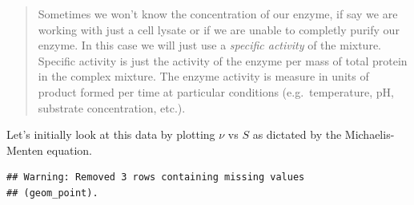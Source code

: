 \documentclass[
]{article}
\newenvironment{Shaded}{\begin{snugshade}}{\end{snugshade}}
\newcommand{\AttributeTok}[1]{\textcolor[rgb]{0.77,0.63,0.00}{#1}}
\newcommand{\DecValTok}[1]{\textcolor[rgb]{0.00,0.00,0.81}{#1}}
\newcommand{\FloatTok}[1]{\textcolor[rgb]{0.00,0.00,0.81}{#1}}
\newcommand{\FunctionTok}[1]{\textcolor[rgb]{0.00,0.00,0.00}{#1}}
\newcommand{\NormalTok}[1]{#1}
\newcommand{\OtherTok}[1]{\textcolor[rgb]{0.56,0.35,0.01}{#1}}
\newcommand{\SpecialCharTok}[1]{\textcolor[rgb]{0.00,0.00,0.00}{#1}}
\newcommand{\StringTok}[1]{\textcolor[rgb]{0.31,0.60,0.02}{#1}}
\begin{document}
\begin{quote}
Sometimes we won't know the concentration of our enzyme, if say we are working with just a cell lysate or if we are unable to completly purify our enzyme. In this case we will just use a \emph{specific activity} of the mixture. Specific activity is just the activity of the enzyme per mass of total protein in the complex mixture. The enzyme activity is measure in units of product formed per time at particular conditions (e.g.~temperature, pH, substrate concentration, etc.).
\end{quote}

Let's initially look at this data by plotting \(\nu\) vs \(S\) as dictated by the Michaelis-Menten equation.

\begin{Shaded}
\end{Shaded}

\begin{verbatim}
## Warning: Removed 3 rows containing missing values
## (geom_point).
\end{verbatim}
\end{document}
